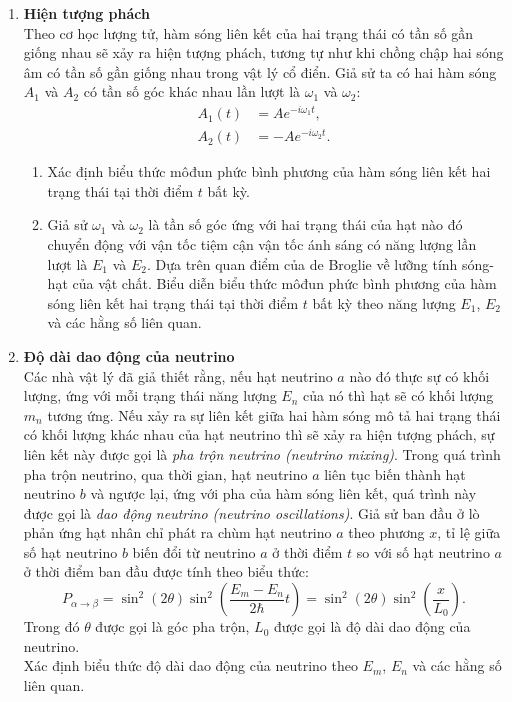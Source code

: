 \begin{enumerate}
    \item \textbf{Hiện tượng phách}\\
    Theo cơ học lượng tử, hàm sóng liên kết của hai trạng thái có tần số gần giống nhau sẽ xảy ra hiện tượng phách, tương tự như khi chồng chập hai sóng âm có tần số gần giống nhau trong vật lý cổ điển. Giả sử ta có hai hàm sóng $A_1$ và $A_2$ có tần số góc khác nhau lần lượt là $\omega_1$ và $\omega_2$:
    \begin{align*}
        A_1(t)&=Ae^{-i\omega_1 t},\\
        A_2(t)&=-Ae^{-i\omega_2 t}.
    \end{align*}
    \begin{enumerate}
    \item Xác định biểu thức môđun phức bình phương của hàm sóng liên kết hai trạng thái tại thời điểm $t$ bất kỳ.
    \item Giả sử $\omega_1$ và $\omega_2$ là tần số góc ứng với hai trạng thái của hạt nào đó chuyển động với vận tốc tiệm cận vận tốc ánh sáng có năng lượng lần lượt là $E_1$ và $E_2$. Dựa trên quan điểm của de Broglie về lưỡng tính sóng-hạt của vật chất. Biểu diễn biểu thức môđun phức bình phương của hàm sóng liên kết hai trạng thái tại thời điểm $t$ bất kỳ theo năng lượng $E_1$, $E_2$ và các hằng số liên quan.
    \end{enumerate}
    \item \textbf{Độ dài dao động của neutrino}\\
    Các nhà vật lý đã giả thiết rằng, nếu hạt neutrino $a$ nào đó thực sự có khối lượng, ứng với mỗi trạng thái năng lượng $E_n$ của nó thì hạt sẽ có khối lượng $m_n$ tương ứng. Nếu xảy ra sự liên kết giữa hai hàm sóng mô tả hai trạng thái có khối lượng khác nhau của hạt neutrino thì sẽ xảy ra hiện tượng phách, sự liên kết này được gọi là \textit{pha trộn neutrino (neutrino mixing)}. Trong quá trình pha trộn neutrino, qua thời gian, hạt neutrino $a$ liên tục biến thành hạt neutrino $b$ và ngược lại, ứng với pha của hàm sóng liên kết, quá trình này được gọi là \textit{dao động neutrino (neutrino oscillations)}. Giả sử ban đầu ở lò phản ứng hạt nhân chỉ phát ra chùm hạt neutrino $a$ theo phương $x$, tỉ lệ giữa số hạt neutrino $b$ biến đổi từ neutrino $a$ ở thời điểm $t$ so với số hạt neutrino $a$ ở thời điểm ban đầu được tính theo biểu thức:
    $$P_{\alpha \rightarrow \beta}=\sin^2(2\theta)\sin^2\left(\dfrac{E_m-E_n}{2\hbar}t\right)=\sin^2(2\theta)\sin^2\left(\dfrac{x}{L_0}\right).$$
    Trong đó $\theta$ được gọi là góc pha trộn, $L_0$ được gọi là độ dài dao động của neutrino.\\
    Xác định biểu thức độ dài dao động của neutrino theo $E_m$, $E_n$ và các hằng số liên quan.


\end{enumerate}

